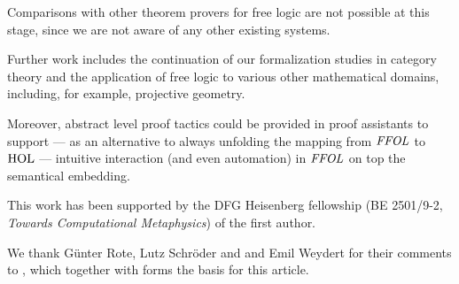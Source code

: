 

Comparisons with other theorem provers for free logic are not possible at this stage, since we are not aware of any other existing systems.

Further work includes the continuation of our formalization studies in
category theory and the application of free logic to various other
mathematical domains, including, for example,  projective geometry.

Moreover, abstract level proof tactics could be provided in proof
assistants to support --- as an alternative to always unfolding the
mapping from $\mathit{FFOL}$ to $\text{\textrm{HOL}}$ --- intuitive interaction (and even
automation) in $\mathit{FFOL}$ on top the semantical embedding. 

\begin{acknowledgements}
This work has been supported by the DFG Heisenberg fellowship (BE
2501/9-2, \emph{Towards Computational Metaphysics}) of the first
author.

We thank G{\"u}nter Rote, Lutz Schr\"oder and and Emil Weydert for their
comments to \cite{ArXiv}, which together with \cite{ICMS} forms the
basis for this article.

\end{acknowledgements}





